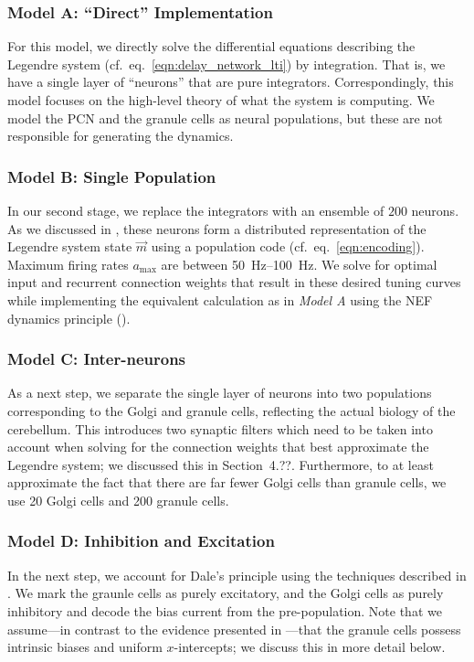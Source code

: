 \subsubsection{Model A: \enquote{Direct} Implementation} 
For this model, we directly solve the differential equations describing the Legendre system (cf.~eq.~\ref{eqn:delay_network_lti}) by integration.
That is, we have a single layer of \enquote{neurons} that are pure integrators.
Correspondingly, this model focuses on the high-level theory of what the system is computing.
We model the PCN and the granule cells as neural populations, but these are not responsible for generating the dynamics.

\subsubsection{Model B: Single Population}
In our second stage, we replace the integrators with an ensemble of $200$ \LIF neurons.
As we discussed in , these neurons form a distributed representation of the Legendre system state $\vec{m}$ using a population code (cf.~eq.~\ref{eqn:encoding}).
Maximum firing rates $a_\mathrm{max}$ are between \SIrange{50}{100}{\hertz}.
We solve for optimal input and recurrent connection weights that result in these desired tuning curves while implementing the equivalent calculation as in \emph{Model A} using the NEF dynamics principle ().

\subsubsection{Model C: Inter-neurons}
As a next step, we separate the single layer of neurons into two populations corresponding to the Golgi and granule cells, reflecting the actual biology of the cerebellum.
This introduces two synaptic filters which need to be taken into account when solving for the connection weights that best approximate the Legendre system; we discussed this in Section~4.??.
Furthermore, to at least approximate the fact that there are far fewer Golgi cells than granule cells, we use 20 Golgi cells and 200 granule cells.

\subsubsection{Model D: Inhibition and Excitation}
In the next step, we account for Dale's principle using the techniques described in .
We mark the graunle cells as purely excitatory, and the Golgi cells as purely inhibitory and decode the bias current from the pre-population.
Note that we assume---in contrast to the evidence presented in ---that the granule cells possess intrinsic biases and uniform $x$-intercepts; we discuss this in more detail below.

